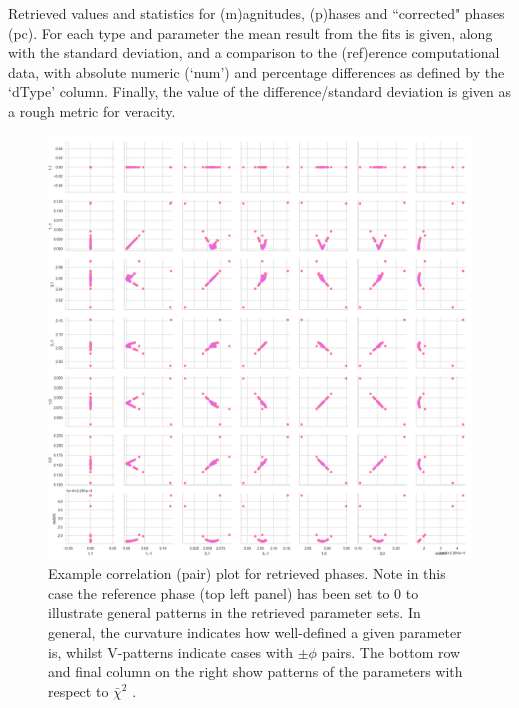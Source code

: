 \documentclass[10pt]{article}
\begin{document}
\begin{table}
\caption{\label{tab:matE}Retrieved values and statistics for (m)agnitudes, (p)hases and ``corrected" phases (pc). For each type and parameter the mean result from the fits is given, along with the standard deviation, and a comparison to the (ref)erence computational data, with absolute numeric (`num') and percentage differences as defined by the `dType' column. Finally, the value of the difference/standard deviation is given as a rough metric for veracity.}
\end{table}

\begin{figure}[]
\begin{center}
\includegraphics[width=\textwidth,height=\dimexpr\textheight-4\baselineskip-\abovecaptionskip-\belowcaptionskip\relax,keepaspectratio]{figures/dataDump_1000fitTests_multiFit_noise_051021_corrPlot_220422.png}
\caption{Example correlation (pair) plot for retrieved phases. Note in this case the reference phase (top left panel) has been set to 0 to illustrate general patterns in the retrieved parameter sets. In general, the curvature indicates how well-defined a given parameter is, whilst V-patterns indicate cases with \(\pm\phi\) pairs. The bottom row and final column on the right show patterns of the parameters with respect to \(\bar{\chi}^2\) .\label{888108}}
\end{center}
\end{figure}
\end{document}

